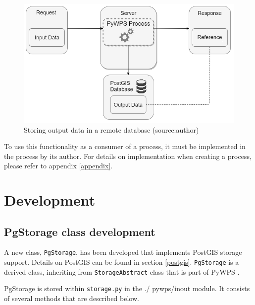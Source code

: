 \begin{figure}[H] \centering
  \includegraphics[width=350pt]{./pictures/newoption.png}
      \caption[Storing output data in a remote database]{Storing output data in a remote database (source:{author})}
      \label{fig:newoption}
  \end{figure}


To use this functionality as a consumer of a process, it must be implemented in the process by its author. For details on implementation when creating a process, please refer to appendix \ref{appendix}.


\section{Development} 

\subsection{PgStorage class development} 

A new class, \texttt{PgStorage}, has been developed that implements
PostGIS storage support. Details on PostGIS can be found in section
 \ref{postgis}. \texttt{PgStorage} is a derived class, inheriting from
\texttt{StorageAbstract} class that is part of PyWPS .

PgStorage is stored within \texttt{storage.py} in the ./
pywps/inout module. It consists of several methods that
are described below.

